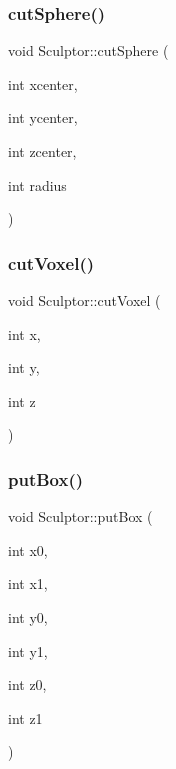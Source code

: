 \mbox{\label{class_sculptor_a67ab8c0ba5116adb8af1d01ad373ac15}} 
\subsubsection{\texorpdfstring{cutSphere()}{cutSphere()}}
{\footnotesize\ttfamily void Sculptor\+::cut\+Sphere (\begin{DoxyParamCaption}\item[{int}]{xcenter,  }\item[{int}]{ycenter,  }\item[{int}]{zcenter,  }\item[{int}]{radius }\end{DoxyParamCaption})}

\mbox{\label{class_sculptor_ad9d714a35fc8ae16d06eb5df37c3493c}} 
\subsubsection{\texorpdfstring{cutVoxel()}{cutVoxel()}}
{\footnotesize\ttfamily void Sculptor\+::cut\+Voxel (\begin{DoxyParamCaption}\item[{int}]{x,  }\item[{int}]{y,  }\item[{int}]{z }\end{DoxyParamCaption})}

\mbox{\label{class_sculptor_a311ad7a0fb83fc67ac1f378be8e99fe1}} 
\subsubsection{\texorpdfstring{putBox()}{putBox()}}
{\footnotesize\ttfamily void Sculptor\+::put\+Box (\begin{DoxyParamCaption}\item[{int}]{x0,  }\item[{int}]{x1,  }\item[{int}]{y0,  }\item[{int}]{y1,  }\item[{int}]{z0,  }\item[{int}]{z1 }\end{DoxyParamCaption})}

